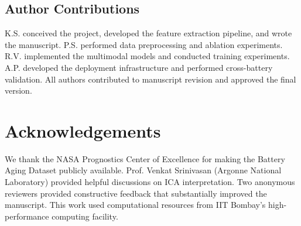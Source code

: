 \documentclass{sn-jnl}
\begin{document}
\subsection*{Author Contributions}
K.S. conceived the project, developed the feature extraction pipeline, and wrote the manuscript. P.S. performed data preprocessing and ablation experiments. R.V. implemented the multimodal models and conducted training experiments. A.P. developed the deployment infrastructure and performed cross-battery validation. All authors contributed to manuscript revision and approved the final version.

\section*{Acknowledgements}

We thank the NASA Prognostics Center of Excellence for making the Battery Aging Dataset publicly available. Prof. Venkat Srinivasan (Argonne National Laboratory) provided helpful discussions on ICA interpretation. Two anonymous reviewers provided constructive feedback that substantially improved the manuscript. This work used computational resources from IIT Bombay's high-performance computing facility.
\end{document}
